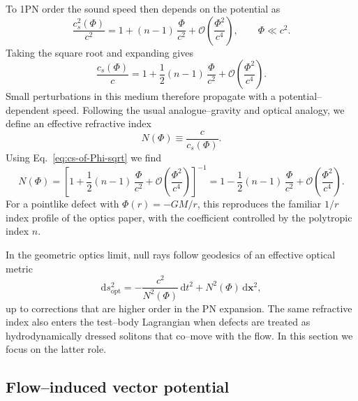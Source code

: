 \documentclass[11pt]{article}
\begin{document}
To 1PN order the sound speed then depends on the potential as
\begin{equation}
  \frac{c_s^2(\Phi)}{c^2}
  = 1 + (n-1)\,\frac{\Phi}{c^2}
    + \mathcal{O}\!\left(\frac{\Phi^2}{c^4}\right),
  \qquad
  \Phi \ll c^2.
  \label{eq:cs-of-Phi-vector}
\end{equation}
Taking the square root and expanding gives
\begin{equation}
  \frac{c_s(\Phi)}{c}
  = 1 + \frac{1}{2}(n-1)\,\frac{\Phi}{c^2}
    + \mathcal{O}\!\left(\frac{\Phi^2}{c^4}\right).
  \label{eq:cs-of-Phi-sqrt}
\end{equation}
Small perturbations in this medium therefore propagate with a
potential--dependent speed.  Following the usual analogue--gravity and
optical analogy, we define an effective refractive index
\begin{equation}
  N(\Phi) \equiv \frac{c}{c_s(\Phi)}.
\end{equation}
Using Eq.~\eqref{eq:cs-of-Phi-sqrt} we find
\begin{equation}
  N(\Phi)
  = \left[ 1 + \frac{1}{2}(n-1)\,\frac{\Phi}{c^2}
      + \mathcal{O}\!\left(\frac{\Phi^2}{c^4}\right) \right]^{-1}
  = 1 - \frac{1}{2}(n-1)\,\frac{\Phi}{c^2}
    + \mathcal{O}\!\left(\frac{\Phi^2}{c^4}\right).
  \label{eq:N-of-Phi}
\end{equation}
For a pointlike defect with \(\Phi(r) = -G M / r\), this reproduces the
familiar \(1/r\) index profile of the optics paper, with the coefficient
controlled by the polytropic index \(n\).

In the geometric optics limit, null rays follow geodesics of an effective
optical metric
\begin{equation}
  \mathrm{d}s_{\text{opt}}^2
  = -\frac{c^2}{N^2(\Phi)}\,\mathrm{d}t^2
    + N^2(\Phi)\,\mathrm{d}\mathbf{x}^2,
  \label{eq:optical-metric}
\end{equation}
up to corrections that are higher order in the PN expansion.  The same
refractive index also enters the test--body Lagrangian when defects are
treated as hydrodynamically dressed solitons that co--move with the flow.
In this section we focus on the latter role.

\subsection{Flow--induced vector potential}
\label{subsec:vector-flow}
\end{document}
